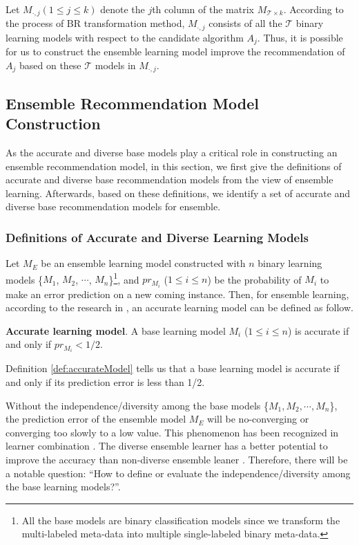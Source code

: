 \documentclass[prodmode,acmtkdd]{acmsmall}
\begin{document}
Let $M_{\cdot,j} (1\leq j \leq k)$ denote the $j$th column of the
matrix $M_{\mathcal{T}\times k}$. According to the process of BR
transformation method, $M_{\cdot,j}$ consists of all the $\mathcal{T}$ binary
learning models with respect to the candidate algorithm $A_j$. Thus,
it is possible for us to construct the ensemble learning model
improve the recommendation of $A_j$ based on these $\mathcal{T}$ models in
$M_{\cdot,j}$.

\subsection{Ensemble Recommendation Model Construction}\label{subsec:ensembleModelConstruction}

As the accurate and diverse base models play a critical role in
constructing an ensemble recommendation model, in this section, we
first give the definitions of accurate and diverse base
recommendation models from the view of ensemble learning.
Afterwards, based on these definitions, we identify a set of
accurate and diverse base recommendation models for ensemble.

\subsubsection{Definitions of Accurate and Diverse Learning Models}\label{subsubsec:accurateAndDiverseModel}

Let $M_{E}$ be an ensemble learning model constructed with $n$
binary learning models \{$M_1$, $M_2$, $\cdots$,
$M_n$\}\footnote{All the base models are binary classification
models since we transform the multi-labeled meta-data into multiple
single-labeled binary meta-data.}, and $pr_{M_i}$ ($1\leq i\leq n$)
be the probability of $M_{i}$ to make an error prediction on a new
coming instance. Then, for ensemble learning, according to the research in \cite{dietterich2000ensemble}, an accurate learning model can be defined as follow.

\begin{definition}\textbf{Accurate learning model}\label{def:accurateModel}.
A base learning model $M_i$ ($1\leq i\leq n$) is accurate if and
only if $pr_{M_i} < 1/2$.
\end{definition}

Definition \ref{def:accurateModel} tells us that a base learning
model is accurate if and only if its prediction error is less than
1/2.

Without the independence/diversity among the base models \{$M_1,
M_2, \cdots, M_n$\}, the prediction error of the ensemble model $M_{E}$
will be no-converging or converging too slowly to a low value. This
phenomenon has been recognized in learner combination
\cite{cunningham2000diversity,lam2000classifier}. The diverse
ensemble learner has a better potential to improve the accuracy than
non-diverse ensemble leaner
\cite{peterson2005estimating,brown2005diversity,kuncheva2003measures}.
Therefore, there will be a notable question: ``How to define or
evaluate the independence/diversity among the base learning
models?''.
\end{document}

